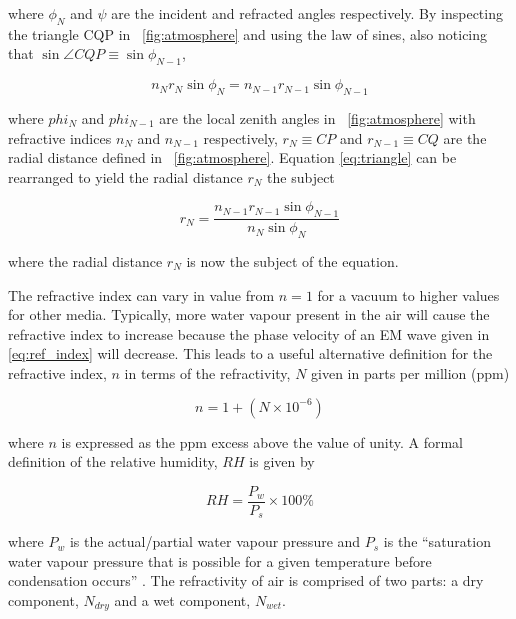 \documentclass{article}
\newcommand{\figref}[2][\figurename~]{#1\ref{#2}}
\begin{document}
\vspace{2mm}
\noindent
where $\phi_N$ and $\psi$ are the incident and refracted angles respectively. By inspecting the triangle CQP in \figref{fig:atmosphere} and using the law of sines, also noticing that $\sin{\angle{CQP}} \equiv \sin{\phi_{N-1}}$, 

\begin{equation}
\label{eq:triangle}
n_Nr_N\sin{\phi_N} = n_{N-1}r_{N-1}\sin{\phi_{N-1}}
\end{equation}


\vspace{2mm}
\noindent
where $phi_N$ and $phi_{N-1}$ are the local zenith angles in \figref{fig:atmosphere} with refractive indices $n_N$ and $n_{N-1}$ respectively, $r_N \equiv CP$ and $r_{N-1} \equiv CQ$ are the radial distance defined in \figref{fig:atmosphere}. Equation \eqref{eq:triangle} can be rearranged to yield the radial distance $r_N$ the subject

\begin{equation}
\label{eq:Snell_law3}
r_N = \frac{n_{N-1}r_{N-1}\sin{\phi_{N-1}}}{n_N\sin{\phi_N}}
\end{equation}

\vspace{2mm}
\noindent
where the radial distance $r_N$ is now the subject of the equation.

\vspace{2mm}
\noindent
The refractive index can vary in value from $n = 1$ for a vacuum to higher values for other media. Typically, more water vapour present in the air will cause the refractive index to increase because the phase velocity of an EM wave given in \eqref{eq:ref_index} will decrease. This leads to a useful alternative definition for the refractive index, $n$ in terms of the refractivity, $N$ given in parts per million (ppm)

\begin{equation}
n = 1  + (N \times 10^{-6})
\label{eq:refractivity}
\end{equation}

\vspace{2mm}
\noindent
where $n$ is expressed as the ppm excess above the value of unity. A formal definition of the relative humidity, $RH$ \cite{Book01} is given by

\begin{equation}
RH = \frac{P_w}{P_s} \times 100\%
\label{eq:humidity}
\end{equation}

\vspace{2mm}
\noindent
where $P_w$ is the actual/partial water vapour pressure and $P_s$ is the ``saturation water vapour pressure that is possible for a given temperature before condensation occurs'' \cite{Book01}. The refractivity of air is comprised of two parts: a dry component, $N_{dry}$ and a wet component, $N_{wet}$.
\end{document}
